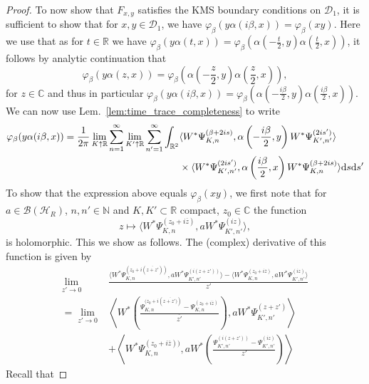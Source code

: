 \documentclass[sn-mathphys-num]{sn-jnl}%
\newcommand{\CC}{\mathbb{C}}
\newcommand{\RR}{\mathbb{R}}
\newcommand{\HH}{\mathcal{H}}
\newcommand{\diff}{\textup{d}}
\numberwithin{equation}{section}
\theoremstyle{thmstyleone}%
\theoremstyle{thmstyletwo}%
\theoremstyle{thmstylethree}%
\begin{document}
\begin{proof}
To now show that $F_{x,y}$ satisfies the KMS boundary conditions on $\mathcal{D}_1$, it is sufficient to show that for $x,y\in\mathcal{D}_1$, we have $\varphi_\beta(y\alpha(i\beta,x))=\varphi_\beta(xy)$. Here we use that as for $t\in\RR$ we have $\varphi_\beta(y\alpha(t,x))=\varphi_\beta(\alpha(-\frac{t}{2},y)\alpha(\frac{t}{2},x))$, it follows by analytic continuation that  \begin{equation}
    \varphi_\beta(y\alpha(z,x))=\varphi_\beta\left(\alpha\left(-\frac{z}{2},y\right)\alpha\left(\frac{z}{2},x\right)\right),
\end{equation}
for $z\in \CC$ and thus in particular $\varphi_\beta(y\alpha(i\beta,x))=\varphi_\beta(\alpha(-\frac{i\beta}{2},y)\alpha(\frac{i\beta}{2},x))$. We can now use Lem.\ \ref{lem:time_trace_completeness} to write
\begin{align}
    \label{eq:KMS_partway}
    \varphi_\beta(y\alpha(i\beta,x))=\frac{1}{2\pi}\lim_{K\uparrow\RR}\sum_{n=1}^\infty \lim_{K'\uparrow\RR}\sum_{n'=1}^\infty\int_{\RR^2}& \langle W^*\Psi_{K,n}^{(\beta+2is)},\alpha\left(-\frac{i\beta}{2},y\right)W^*\Psi_{K',n'}^{(2is')}\rangle\nonumber\\
    &\times\langle W^*\Psi_{K',n'}^{(2is')},\alpha\left(\frac{i\beta}{2},x\right)W^*\Psi_{K,n}^{(\beta+2is)}\rangle\diff s\diff s'
\end{align}
To show that the expression above equals $\varphi_\beta(xy)$, we first note that for $a\in\mathcal{B}(\HH_R)$, $n,n'\in\mathbb{N}$ and $K,K'\subset\RR$ compact, $z_0\in\CC$
the function \begin{equation}
    z\mapsto \langle W^*\Psi_{K,n}^{(z_0+i\overline{z})}, a W^*\Psi_{K',n'}^{(iz)}\rangle,
\end{equation} is holomorphic. This we show as follows. The (complex) derivative of this function is given by
\begin{align}
    \lim_{z'\to 0}&\frac{\langle W^*\Psi_{K,n}^{(z_0+i(\overline{z+z'}))}, a W^*\Psi_{K',n'}^{(i(z+z'))}\rangle-\langle W^*\Psi_{K,n}^{(z_0+i\overline{z})}, a W^*\Psi_{K',n'}^{(iz)}\rangle}{z'}\nonumber\\
    =\lim_{z'\to 0}&\left\langle W^*\left(\frac{\Psi_{K,n}^{(z_0+i(\overline{z+z')})}-\Psi_{K,n}^{(z_0+i\overline{z})}}{\overline{z'}}\right), a W^*\Psi_{K',n'}^{(z+z')}\right\rangle\nonumber\\
    &+\left\langle W^*\Psi_{K,n}^{(z_0+i\overline{z}))}, a W^*\left(\frac{\Psi_{K',n'}^{(i(z+z'))}-\Psi_{K',n'}^{(iz)}}{z'}\right)\right\rangle
\end{align}
Recall that

\end{proof}
\end{document}
